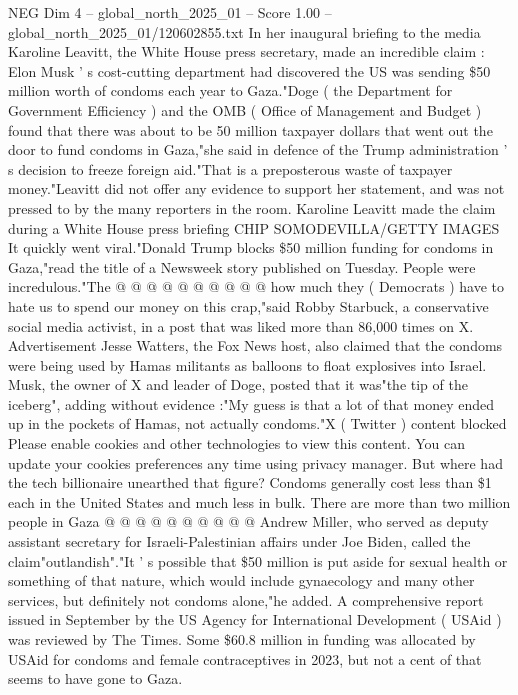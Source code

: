 \begin{textsample}{NEG Dim 4 – global\_north\_2025\_01 – Score 1.00 – global\_north\_2025\_01/120602855.txt}  \label{ex:f4_neg_420}
In her inaugural briefing to the media Karoline Leavitt, the White House press secretary, made an incredible claim : Elon Musk ' s cost-cutting department had discovered the US was sending \$50 million worth of condoms each year to Gaza."Doge ( the Department for Government Efficiency ) and the OMB ( Office of Management and Budget ) found that there was about to be 50 million taxpayer dollars that went out the door to fund condoms in Gaza,"she said in defence of the Trump administration ' s decision to freeze foreign aid."That is a preposterous waste of taxpayer money."Leavitt did not offer any evidence to support her statement, and was not pressed to by the many reporters in the room.
Karoline Leavitt made the claim during a White House press briefing CHIP SOMODEVILLA/GETTY IMAGES It quickly went viral."Donald Trump blocks \$50 million funding for condoms in Gaza,"read the title of a Newsweek story published on Tuesday.
People were incredulous."The @ @ @ @ @ @ @ @ @ @ how much they ( Democrats ) have to hate us to spend our money on this crap,"said Robby Starbuck, a conservative social media activist, in a post that was liked more than 86,000 times on X.
Advertisement Jesse Watters, the Fox News host, also claimed that the condoms were being used by Hamas militants as balloons to float explosives into Israel.
Musk, the owner of X and leader of Doge, posted that it was"the tip of the iceberg", adding without evidence :"My guess is that a lot of that money ended up in the pockets of Hamas, not actually condoms."X ( Twitter ) content blocked Please enable cookies and other technologies to view this content.
You can update your cookies preferences any time using privacy manager.
But where had the tech billionaire unearthed that figure?
Condoms generally cost less than \$1 each in the United States and much less in bulk.
There are more than two million people in Gaza @ @ @ @ @ @ @ @ @ @ Andrew Miller, who served as deputy assistant secretary for Israeli-Palestinian affairs under Joe Biden, called the claim"outlandish"."It ' s possible that \$50 million is put aside for sexual health or something of that nature, which would include gynaecology and many other services, but definitely not condoms alone,"he added.
A comprehensive report issued in September by the US Agency for International Development ( USAid ) was reviewed by The Times.
Some \$60.8 million in funding was allocated by USAid for condoms and female contraceptives in 2023, but not a cent of that seems to have gone to Gaza.

\end{textsample}

